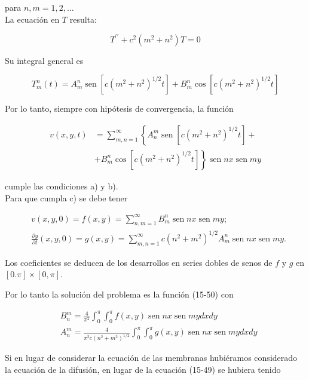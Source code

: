 \documentclass[10pt]{article}
\theoremstyle{plain}
\theoremstyle{definition}
\theoremstyle{remark}
\begin{document}
para $n, m=1,2, \ldots$\\
La ecuación en $T$ resulta:


\begin{equation*}
T^{\prime \prime}+c^{2}\left(m^{2}+n^{2}\right) T=0 \tag{15-49}
\end{equation*}


Su integral general es

$$
T_{m}^{n}(t)=A_{m}^{n} \operatorname{sen}\left[c\left(m^{2}+n^{2}\right)^{1 / 2} t\right]+B_{m}^{n} \cos \left[c\left(m^{2}+n^{2}\right)^{1 / 2} t\right]
$$

Por lo tanto, siempre con hipótesis de convergencia, la función


\begin{align*}
v(x, y, t) & =\sum_{m, n=1}^{\infty}\left\{A_{n}^{m} \operatorname{sen}\left[c\left(m^{2}+n^{2}\right)^{1 / 2} t\right]+\right. \\
& \left.+B_{m}^{n} \cos \left[c\left(m^{2}+n^{2}\right)^{1 / 2} t\right]\right\} \operatorname{sen} n x \operatorname{sen} m y \tag{15-50}
\end{align*}


cumple las condiciones a) y b).\\
Para que cumpla c) se debe tener

$$
\begin{aligned}
& v(x, y, 0)=f(x, y)=\sum_{n, m=1}^{\infty} B_{m}^{n} \operatorname{sen} n x \operatorname{sen} m y ; \\
& \frac{\partial y}{\partial t}(x, y, 0)=g(x, y)=\sum_{m, n=1}^{\infty} c\left(n^{2}+m^{2}\right)^{1 / 2} A_{m}^{n} \operatorname{sen} n x \operatorname{sen} m y .
\end{aligned}
$$

Los coeficientes se deducen de los desarrollos en series dobles de senos de $f$ y $g$ en $[0 . \pi] \times[0, \pi]$.

Por lo tanto la solución del problema es la función (15-50) con

$$
\begin{aligned}
& B_{n}^{m}=\frac{4}{\pi^{2}} \int_{0}^{\pi} \int_{0}^{\pi} f(x, y) \operatorname{sen} n x \operatorname{sen} m y d x d y \\
& A_{n}^{m}=\frac{4}{\pi^{2} c\left(n^{2}+m^{2}\right)^{1 / 2}} \int_{0}^{\pi} \int_{0}^{\pi} g(x, y) \operatorname{sen} n x \operatorname{sen} m y d x d y
\end{aligned}
$$

Si en lugar de considerar la ecuación de las membranas hubiéramos considerado la ecuación de la difusión, en lugar de la ecuación (15-49) se hubiera tenido
\end{document}
